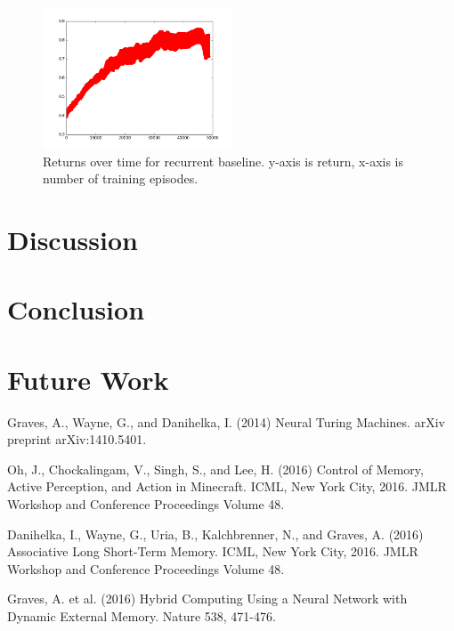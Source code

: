 \documentclass{article}
\begin{document}
\begin{figure}[!ht]
\center
\includegraphics[width=0.5\textwidth]{images/recurrent_ret.png}
\caption{Returns over time for recurrent baseline. y-axis is return, x-axis is number of training episodes.}
\label{fig:recurrent}
\end{figure}

\section*{Discussion}

\section*{Conclusion}

\section*{Future Work}


\begin{thebibliography}{plain}
Graves, A., Wayne, G., and Danihelka, I. (2014) Neural Turing Machines. arXiv preprint arXiv:1410.5401.

Oh, J., Chockalingam, V., Singh, S., and Lee, H. (2016) Control of Memory, Active Perception, and Action in Minecraft. ICML, New York City, 2016. JMLR Workshop and Conference Proceedings Volume 48.

Danihelka, I., Wayne, G., Uria, B., Kalchbrenner, N., and Graves, A. (2016) Associative Long Short-Term Memory. ICML, New York City, 2016. JMLR Workshop and Conference Proceedings Volume 48.

Graves, A. et al. (2016) Hybrid Computing Using a Neural Network with Dynamic External Memory. Nature 538, 471-476.
\end{thebibliography}
\end{document}
